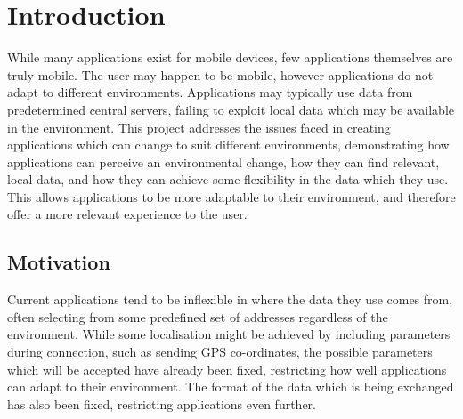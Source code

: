 \documentclass[12pt,twoside,notitlepage]{report}
\begin{document}
\bigskip
\bigskip
{}

\bigskip
\bigskip
{}

\cleardoublepage

\tableofcontents

\listoffigures

\newpage


\cleardoublepage        %

\setcounter{page}{1}
\pagestyle{headings}

\chapter{Introduction}

While many applications exist for mobile devices, few applications themselves are truly mobile. 
The user may happen to be mobile, however applications do not adapt to different environments. 
Applications may typically use data from predetermined central servers, failing to exploit local data which may be available in the environment. 
This project addresses the issues faced in creating applications which can change to suit different environments, demonstrating how applications can perceive an environmental change, how they can find relevant, local data, and how they can achieve some flexibility in the data which they use. 
This allows applications to be more adaptable to their environment, and therefore offer a more relevant experience to the user. 

\section{Motivation}

Current applications tend to be inflexible in where the data they use comes from, often selecting from some predefined set of addresses regardless of the environment. 
While some localisation might be achieved by including parameters during connection, such as sending GPS co-ordinates, the possible parameters which will be accepted have already been fixed, restricting how well applications can adapt to their environment. 
The format of the data which is being exchanged has also been fixed, restricting applications even further.
\end{document}
